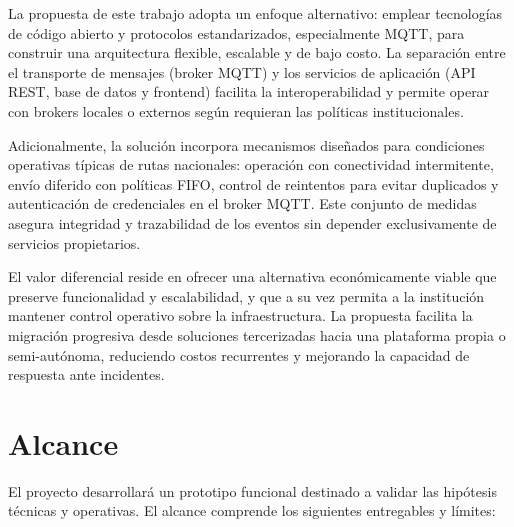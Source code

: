 La propuesta de este trabajo adopta un enfoque alternativo: emplear tecnologías de código abierto y protocolos estandarizados, especialmente MQTT, para construir una arquitectura flexible, escalable y de bajo costo. La separación entre el transporte de mensajes (broker MQTT) y los servicios de aplicación (API REST, base de datos y frontend) facilita la interoperabilidad y permite operar con brokers locales o externos según requieran las políticas institucionales.

Adicionalmente, la solución incorpora mecanismos diseñados para condiciones operativas típicas de rutas nacionales: operación con conectividad intermitente, envío diferido con políticas FIFO, control de reintentos para evitar duplicados y autenticación de credenciales en el broker MQTT. Este conjunto de medidas asegura integridad y trazabilidad de los eventos sin depender exclusivamente de servicios propietarios.

El valor diferencial reside en ofrecer una alternativa económicamente viable que preserve funcionalidad y escalabilidad, y que a su vez permita a la institución mantener control operativo sobre la infraestructura. La propuesta facilita la migración progresiva desde soluciones tercerizadas hacia una plataforma propia o semi-autónoma, reduciendo costos recurrentes y mejorando la capacidad de respuesta ante incidentes.

\newpage

\section{Alcance}
El proyecto desarrollará un prototipo funcional destinado a validar las hipótesis técnicas y operativas. El alcance comprende los siguientes entregables y límites:

